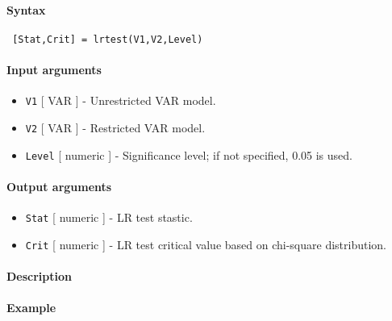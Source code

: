 


	\paragraph{Syntax}
 
 \begin{verbatim}
 [Stat,Crit] = lrtest(V1,V2,Level)
 \end{verbatim}
 
 \paragraph{Input arguments}
 
 \begin{itemize}
 \item
   \texttt{V1} {[} VAR {]} - Unrestricted VAR model.
 \item
   \texttt{V2} {[} VAR {]} - Restricted VAR model.
 \item
   \texttt{Level} {[} numeric {]} - Significance level; if not specified,
   0.05 is used.
 \end{itemize}
 
 \paragraph{Output arguments}
 
 \begin{itemize}
 \item
   \texttt{Stat} {[} numeric {]} - LR test stastic.
 \item
   \texttt{Crit} {[} numeric {]} - LR test critical value based on
   chi-square distribution.
 \end{itemize}
 
 \paragraph{Description}
 
 \paragraph{Example}


